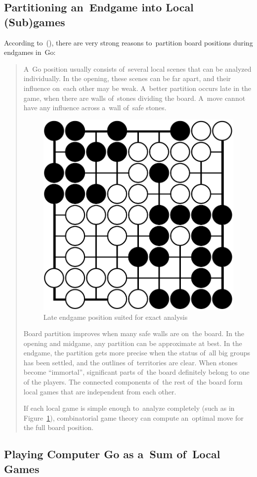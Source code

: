 \subsection{Partitioning an~Endgame into Local (Sub)games}

According to~(\cite{Muller1995computer}), there are very strong reasons to~partition board positions during endgames in~Go:
\begin{quotation}
  A~Go position usually consists of~several local scenes that can be analyzed individually.
  In the opening, these scenes can be far apart, and their influence on~each other may be weak.
  A~better partition occurs late in the game, when there are walls of~stones dividing the board.
  A~move cannot have any influence across a~wall of~safe stones.

  \begin{figure}[H]
    \centering
    \includegraphics[width=.4\textwidth]{../img/late_endgame_Go_position_suited_for_exact_analysis.png}
    \caption{Late endgame position suited for exact analysis}
    \label{fig:late-Go-endgame}
  \end{figure}

  Board partition improves when many safe walls are on~the board.
  In the opening and midgame, any partition can be approximate at best.
  In the endgame, the partition gets more precise when the status of~all big groups has been settled, and the outlines of~territories are clear.
  When stones become ``immortal'', significant parts of~the board definitely belong to one of the players.
  The connected components of~the rest of~the board form local games that are independent from each other.

  If each local game is simple enough to~analyze completely (such as in Figure~\ref{fig:late-Go-endgame}), combinatorial game theory can compute an~optimal move for the full board position.
\end{quotation}

\subsection{Playing Computer Go as a~Sum of~Local Games}

